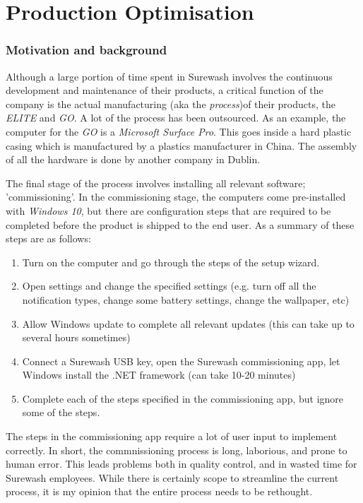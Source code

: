 \part{Production Optimisation}

\section{Motivation and background}
Although a large portion of time spent in Surewash involves the continuous development and maintenance of their products, a critical function of the company is the actual manufacturing (aka the {\slshape process})of their products, the {\slshape ELITE} and {\slshape GO}. A lot of the process has been outsourced. As an example, the computer for the {\slshape GO} is a {\slshape Microsoft Surface Pro}. This goes inside a hard plastic casing which is manufactured by a plastics manufacturer in China. The assembly of all the hardware is done by another company in Dublin.

The final stage of the process involves installing all relevant software; 'commissioning'. In the commissioning stage, the computers come pre-installed with {\slshape Windows 10}, but there are configuration steps that are required to be completed before the product is shipped to the end user. As a summary of these steps are as follows:
\begin{enumerate}
    \item Turn on the computer and go through the steps of the setup wizard.
    \item Open settings and change the specified settings (e.g. turn off all the notification types, change some battery settings, change the wallpaper, etc)
    \item Allow Windows update to complete all relevant updates (this can take up to several hours sometimes)
    \item Connect a Surewash USB key, open the Surewash commissioning app, let Windows install the .NET framework (can take 10-20 minutes)
    \item Complete each of the steps specified in the commissioning app, but ignore some of the steps.
\end{enumerate}

The steps in the commissioning app require a lot of user input to implement correctly. In short, the commnissioning process is long, laborious, and prone to human error. This leads problems both in quality control, and in wasted time for Surewash employees. While there is certainly scope to streamline the current process, it is my opinion that the entire process needs to be rethought.

